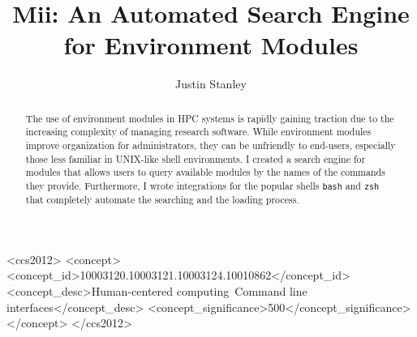 \documentclass[manuscript,screen]{acmart}
\begin{document}
\title{Mii: An Automated Search Engine for Environment Modules}

\author{Justin Stanley}

\begin{abstract}
The use of environment modules in HPC systems is rapidly gaining traction due to the increasing complexity of
managing research software. While environment modules improve organization for administrators, they can be
unfriendly to end-users, especially those less familiar in UNIX-like shell environments. I created a search engine for
modules that allows users to query available modules by the names of the commands they provide. Furthermore,
I wrote integrations for the popular shells \texttt{bash} and \texttt{zsh} that completely automate the searching and the loading
process.
\end{abstract}

\begin{CCSXML}
<ccs2012>
<concept>
<concept_id>10003120.10003121.10003124.10010862</concept_id>
<concept_desc>Human-centered computing~Command line interfaces</concept_desc>
<concept_significance>500</concept_significance>
</concept>
</ccs2012>
\end{CCSXML}




\maketitle
\end{document}
